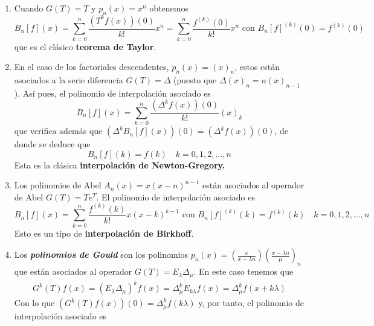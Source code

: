 \begin{ej}
    \begin{enumerate}
        \item Cuando $G(T) = T$ y $p_n(x) = x^n$ obtenemos
        \begin{equation*}
            B_n[f](x) = \sum_{k=0}^n \frac{(T^k f(x))(0)}{k!}x^n = \sum_{k=0}^n \frac{f^{(k)}(0)}{k!}x^n \text{ con } B_n[f]^{(k)}(0) = f^{(k)}(0)
        \end{equation*} 
        que es el clásico \textbf{teorema de Taylor}.
        \item En el caso de los factoriales descendentes, $p_n(x) = (x)_n$, estos están asociados a la serie diferencia $G(T) = \Delta$ (puesto que $\Delta(x)_n = n(x)_{n-1}$). Así pues, el polinomio de interpolación asociado es
        \begin{equation*}
            B_n[f](x) = \sum_{k=0}^n \frac{(\Delta^k f(x))(0)}{k!} (x)_k
        \end{equation*}
        que verifica además que $(\Delta^k B_n[f](x))(0) = (\Delta^k f(x))(0)$, de donde se deduce que
        \begin{equation*}
            B_n[f](k) = f(k) \quad k=0,1,2, \dots ,n
        \end{equation*}
        Esta es la clásica \textbf{interpolación de Newton-Gregory.}
        \item Los polinomios de Abel $A_n(x) = x(x-n)^{n-1}$ están asociados al operador de Abel $G(T) = Te^T$. El polinomio de interpolación asociado es
        \begin{equation*}
            B_n[f](x) = \sum_{k=0}^n \frac{f^{(k)}(k)}{k!}x(x-k)^{k-1} \text{ con } B_n[f]^{(k)}(k) = f^{(k)}(k) \quad k = 0, 1, 2, \dots, n
        \end{equation*}
        Esto es un tipo de \textbf{interpolación de Birkhoff}.
        \item Los \textit{\textbf{polinomios de Gould}} son los polinomios $p_n(x) = (\frac{x}{x - \lambda n})(\frac{x- \lambda n}{\mu})_n$ que están asociados al operador $G(T) = E_{\lambda} \Delta_{\mu}$. En este caso tenemos que
        \begin{align*}
             G^k(T) f(x) = (E_{\lambda} \Delta_{\mu})^k f(x) = \Delta_{\mu}^k E_{k\lambda} f(x) = \Delta_{\mu}^k f(x + k \lambda)
        \end{align*}
        Con lo que $(G^k(T) f(x))(0) = \Delta_{\mu}^k f(k \lambda)$ y, por tanto, el polinomio de interpolación asociado es
        \begin{equation*}

\end{equation*}
\end{enumerate}
\end{ej}

